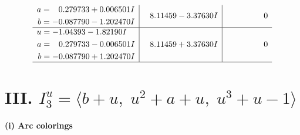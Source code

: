 \documentclass[1p]{elsarticle_modified}
\theoremstyle{definition}
\begin{document}
$$\begin{array}{c|c|c}
\begin{aligned}
a &= \phantom{-}0.279733 + 0.006501 I \\
b &= -0.087790 - 1.202470 I\end{aligned}
 & \phantom{-}8.11459 - 3.37630 I & \phantom{-0.000000 } 0 \\ \hline\begin{aligned}
u &= -1.04393 - 1.82190 I \\
a &= \phantom{-}0.279733 - 0.006501 I \\
b &= -0.087790 + 1.202470 I\end{aligned}
 & \phantom{-}8.11459 + 3.37630 I & \phantom{-0.000000 } 0\\
 \hline 
 \end{array}$$\newpage\newpage\renewcommand{\arraystretch}{1}
\centering \section*{III. $I^u_{3}= \langle b+u,\;u^2+a+u,\;u^3+u-1 \rangle$}
\flushleft \textbf{(i) Arc colorings}\\
\end{document}
